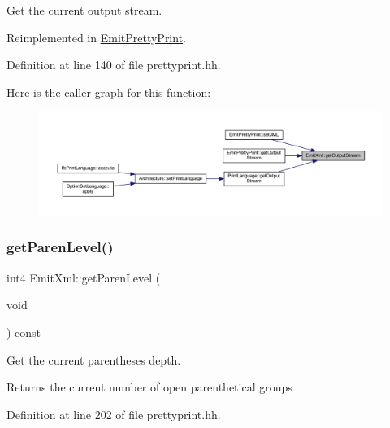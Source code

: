 Get the current output stream. 



Reimplemented in \mbox{\hyperlink{class_emit_pretty_print_a599c4cdff19adb310a2a6a4109c4712a}{Emit\+Pretty\+Print}}.



Definition at line 140 of file prettyprint.\+hh.

Here is the caller graph for this function\+:
\nopagebreak
\begin{figure}[H]
\begin{center}
\leavevmode
\includegraphics[width=350pt]{class_emit_xml_a1190216f59dd61157699a2ee4f2f4b29_icgraph}
\end{center}
\end{figure}
\mbox{\label{class_emit_xml_a3b617734f88c3993693de9a3b62027b4}} 
\subsubsection{\texorpdfstring{getParenLevel()}{getParenLevel()}}
{\footnotesize\ttfamily int4 Emit\+Xml\+::get\+Paren\+Level (\begin{DoxyParamCaption}\item[{void}]{ }\end{DoxyParamCaption}) const\hspace{0.3cm}{\ttfamily [inline]}}



Get the current parentheses depth. 

\begin{DoxyReturn}{Returns}
the current number of open parenthetical groups 
\end{DoxyReturn}


Definition at line 202 of file prettyprint.\+hh.

\mbox{\label{class_emit_xml_a7f370f4d245182bc6132885a0e8b4d71}} 
